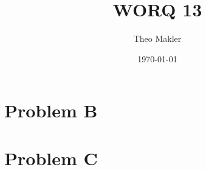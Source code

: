 \documentclass[a4paper]{article}
\title{WORQ 13}
\author{Theo Makler}
\date{\today}
\begin{document}
\maketitle

\section{Problem B}

\pagebreak

\section{Problem C}
\end{document}
